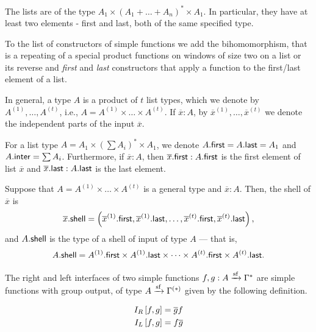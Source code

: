 
The lists are of the type $A_1 \times (A_1 + \dots + A_n )^* \times A_1 $. In particular, they have at least two elements - first and last, both of the same specified type.

To the list of constructors of simple functions we add the bihomomorphism, that is a repeating of a special product functions on windows of size two on a list or its reverse and \emph{first} and \emph{last} constructors that apply a function to the first/last element of a list.

In general, a type $A$ is a product of $t$ list types, which we denote by $A^{(1)}, \dots, A^{(t)}$, i.e., $A = A^{(1)} \times \dots \times A^{(t)}$. If $\overline x : A$, by $\overline x^{(1)}, \dots, \overline x^{(t)}$ we denote the independent parts of the input $\overline x$.

For a list type $A = A_1 \times (\sum A_i)^* \times A_1$, we denote $A . \mathsf{first} = A . \mathsf{last} = A_1$ and $A . \mathsf{inter} = \sum A_i$. Furthermore, if $\overline x : A$, then $\overline x . \mathsf{first} : A . \mathsf{first}$ is the first element of list $\overline x$ and $\overline x . \mathsf{last} : A . \mathsf{last}$ is the last element.

\begin{definition}[Shell]
    Suppose that $A = A^{(1)} \times \dots \times A^{(t)}$ is a general type and $\overline x : A$. Then, the shell of $\overline x$ is
    \[
        \overline x . \mathsf{shell} = \left(\overline x^{(1)} . \mathsf{first}, \overline x^{(1)} . \mathsf{last}, \dots, \overline x^{(t)} . \mathsf{first}, \overline x^{(t)} . \mathsf{last} \right),
    \]
    and $A . \mathsf{shell}$ is the type of a shell of input of type $A$ --- that is, 
    \[
        A . \mathsf{shell} = A^{(1)} . \mathsf{first} \times A^{(1)} . \mathsf{last} \times \dots \times A^{(t)} . \mathsf{first} \times A^{(t)} . \mathsf{last}.
    \]
\end{definition}



\begin{definition}[Interface]
    The right and left interfaces of two simple functions $f, g: A \xrightarrow{\mathrm{sf}} \Gamma^*$ are simple functions with group output, of type $A \xrightarrow{\mathrm{sf}} \Gamma^{(*)}$ given by the following definition.

    \begin{align*}
        I_R \left[ f, g \right] = \overline{g}f \\
        I_L \left[ f, g \right] = f\overline{g}
    \end{align*}

\end{definition}

